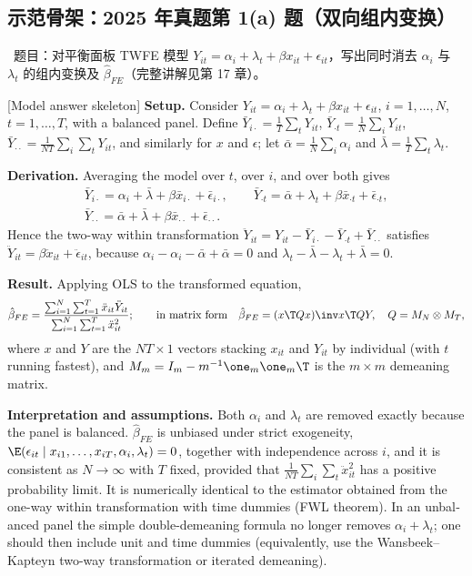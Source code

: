 \subsection{示范骨架：2025 年真题第 1(a) 题（双向组内变换）}

\tagexam\ 题目：对平衡面板 TWFE 模型 $Y_{it}=\alpha_i+\lambda_t+\beta x_{it}+\epsilon_{it}$，写出同时消去 $\alpha_i$ 与 $\lambda_t$ 的组内变换及 $\hat\beta_{FE}$（完整讲解见第 17 章）。

\begin{english}[Model answer skeleton]
\textbf{Setup.} Consider $Y_{it}=\alpha_i+\lambda_t+\beta x_{it}+\epsilon_{it}$, $i=1,\dots,N$, $t=1,\dots,T$, with a balanced panel. Define $\bar Y_{i\cdot}=\frac1T\sum_t Y_{it}$, $\bar Y_{\cdot t}=\frac1N\sum_i Y_{it}$, $\bar Y_{\cdot\cdot}=\frac{1}{NT}\sum_i\sum_t Y_{it}$, and similarly for $x$ and $\epsilon$; let $\bar\alpha=\frac1N\sum_i\alpha_i$ and $\bar\lambda=\frac1T\sum_t\lambda_t$.

\textbf{Derivation.} Averaging the model over $t$, over $i$, and over both gives
\begin{gather*}
\bar Y_{i\cdot}=\alpha_i+\bar\lambda+\beta\bar x_{i\cdot}+\bar\epsilon_{i\cdot},\qquad
\bar Y_{\cdot t}=\bar\alpha+\lambda_t+\beta\bar x_{\cdot t}+\bar\epsilon_{\cdot t},\\
\bar Y_{\cdot\cdot}=\bar\alpha+\bar\lambda+\beta\bar x_{\cdot\cdot}+\bar\epsilon_{\cdot\cdot}.
\end{gather*}
Hence the two-way within transformation $\ddot Y_{it}=Y_{it}-\bar Y_{i\cdot}-\bar Y_{\cdot t}+\bar Y_{\cdot\cdot}$ satisfies $\ddot Y_{it}=\beta\ddot x_{it}+\ddot\epsilon_{it}$, because $\alpha_i-\alpha_i-\bar\alpha+\bar\alpha=0$ and $\lambda_t-\bar\lambda-\lambda_t+\bar\lambda=0$.

\textbf{Result.} Applying OLS to the transformed equation,
\[
\hat\beta_{FE}=\frac{\sum_{i=1}^N\sum_{t=1}^T\ddot x_{it}\ddot Y_{it}}{\sum_{i=1}^N\sum_{t=1}^T\ddot x_{it}^2};
\qquad\text{in matrix form}\quad \hat\beta_{FE}=(x\T Qx)\inv x\T QY,\quad Q=M_N\otimes M_T ,
\]
where $x$ and $Y$ are the $NT\times 1$ vectors stacking $x_{it}$ and $Y_{it}$ by individual (with $t$ running fastest), and $M_m=I_m-m^{-1}\one_m\one_m\T$ is the $m\times m$ demeaning matrix.

\textbf{Interpretation and assumptions.} Both $\alpha_i$ and $\lambda_t$ are removed exactly because the panel is balanced. $\hat\beta_{FE}$ is unbiased under strict exogeneity, $\E(\epsilon_{it}\mid x_{i1},\dots,x_{iT},\alpha_i,\lambda_t)=0$, together with independence across $i$, and it is consistent as $N\to\infty$ with $T$ fixed, provided that $\frac{1}{NT}\sum_i\sum_t\ddot x_{it}^2$ has a positive probability limit. It is numerically identical to the estimator obtained from the one-way within transformation with time dummies (FWL theorem). In an unbalanced panel the simple double-demeaning formula no longer removes $\alpha_i+\lambda_t$; one should then include unit and time dummies (equivalently, use the Wansbeek--Kapteyn two-way transformation or iterated demeaning).
\end{english}

